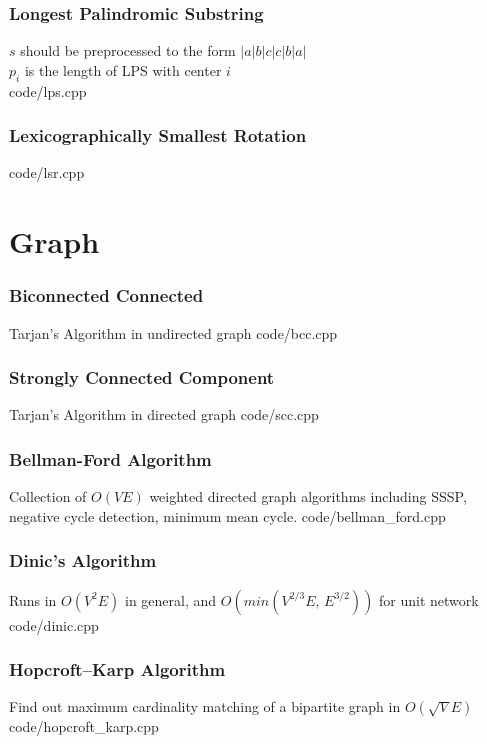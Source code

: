 \documentclass [landscape,8pt,a4paper,twocolumn]{article}
\begin{document}
\vfill\null

\section{Longest Palindromic Substring}
$ s $ should be preprocessed to the form $ |a|b|c|c|b|a| $\\
$ p_i $ is the length of  LPS with center $ i $\\
 {code/lps.cpp}

\section{Lexicographically Smallest Rotation}
 {code/lsr.cpp}

\newpage
\part{Graph}

\section{Biconnected Connected}
Tarjan's Algorithm in undirected graph
 {code/bcc.cpp}

\section{Strongly Connected Component}
Tarjan's Algorithm in directed graph
 {code/scc.cpp}

\section{Bellman-Ford Algorithm}
Collection of $ O(VE) $ weighted directed graph algorithms including SSSP, negative cycle detection, minimum mean cycle.
 {code/bellman_ford.cpp}

\vfill\null

\section{Dinic's Algorithm}
Runs in $ O(V^2E) $ in general, and $ O(min(V^{2/3}E,\, E^{3/2})) $ for unit network
 {code/dinic.cpp}

\section{Hopcroft–Karp Algorithm}
Find out maximum cardinality matching of a bipartite graph in $ O(\sqrt{V}E) $
 {code/hopcroft_karp.cpp}
\end{document}
